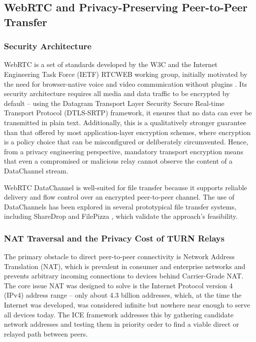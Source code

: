 \documentclass[12pt,a4paper]{article}
\begin{document}
\subsection{WebRTC and Privacy-Preserving Peer-to-Peer Transfer}

\subsubsection{Security Architecture}

WebRTC is a set of standards developed by the W3C and the Internet Engineering Task Force (IETF) RTCWEB working group, initially motivated by the need for browser-native voice and video communication without plugins \cite{rfc8825}. Its security architecture \cite{rfc8827} requires all media and data traffic to be encrypted by default – using the Datagram Transport Layer Security Secure Real-time Transport Protocol (DTLS-SRTP) framework, it ensures that no data can ever be transmitted in plain text. Additionally, this is a qualitatively stronger guarantee than that offered by most application-layer encryption schemes, where encryption is a policy choice that can be misconfigured or deliberately circumvented. Hence, from a privacy engineering perspective, mandatory transport encryption means that even a compromised or malicious relay cannot observe the content of a DataChannel stream.

WebRTC DataChannel \cite{rfc8831} is well-suited for file transfer because it supports reliable delivery and flow control over an encrypted peer-to-peer channel. The use of DataChannels has been explored in several prototypical file transfer systems, including ShareDrop \cite{sharedrop} and FilePizza \cite{filepizza}, which validate the approach’s feasibility.

\subsubsection{NAT Traversal and the Privacy Cost of TURN Relays}

The primary obstacle to direct peer-to-peer connectivity is Network Address Translation (NAT), which is prevalent in consumer and enterprise networks and prevents arbitrary incoming connections to devices behind Carrier-Grade NAT. The core issue NAT was designed to solve is the Internet Protocol version 4 (IPv4) address range – only about 4.3 billion addresses, which, at the time the Internet was developed, was considered infinite but nowhere near enough to serve all devices today. The ICE framework \cite{rfc8445} addresses this by gathering candidate network addresses and testing them in priority order to find a viable direct or relayed path between peers.
\end{document}
